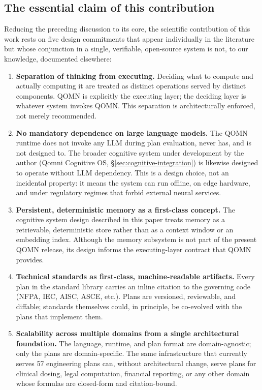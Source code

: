 \documentclass[11pt,a4paper]{article}
\begin{document}
\begin{enumerate}[leftmargin=*]
\subsection{The essential claim of this contribution}
\label{sec:essential-claim}

Reducing the preceding discussion to its core, the scientific contribution of this work rests on five design commitments that appear individually in the literature but whose conjunction in a single, verifiable, open-source system is not, to our knowledge, documented elsewhere:

\begin{enumerate}[leftmargin=*,itemsep=0.4em]
\item \textbf{Separation of thinking from executing.} Deciding what to compute and actually computing it are treated as distinct operations served by distinct components. QOMN is explicitly the executing layer; the deciding layer is whatever system invokes QOMN. This separation is architecturally enforced, not merely recommended.
\item \textbf{No mandatory dependence on large language models.} The QOMN runtime does not invoke any LLM during plan evaluation, never has, and is not designed to. The broader cognitive system under development by the author (Qomni Cognitive OS, \S\ref{sec:cognitive-integration}) is likewise designed to operate without LLM dependency. This is a design choice, not an incidental property: it means the system can run offline, on edge hardware, and under regulatory regimes that forbid external neural services.
\item \textbf{Persistent, deterministic memory as a first-class concept.} The cognitive system design described in this paper treats memory as a retrievable, deterministic store rather than as a context window or an embedding index. Although the memory subsystem is not part of the present QOMN release, its design informs the executing-layer contract that QOMN provides.
\item \textbf{Technical standards as first-class, machine-readable artifacts.} Every plan in the standard library carries an inline citation to the governing code (NFPA, IEC, AISC, ASCE, etc.). Plans are versioned, reviewable, and diffable; standards themselves could, in principle, be co-evolved with the plans that implement them.
\item \textbf{Scalability across multiple domains from a single architectural foundation.} The language, runtime, and plan format are domain-agnostic; only the plans are domain-specific. The same infrastructure that currently serves 57 engineering plans can, without architectural change, serve plans for clinical dosing, legal computation, financial reporting, or any other domain whose formulas are closed-form and citation-bound.
\end{enumerate}


\end{enumerate}
\end{document}
